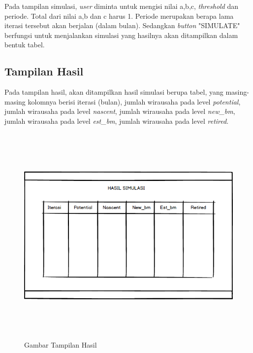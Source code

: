 Pada tampilan simulasi, \textit{user} diminta untuk mengisi nilai a,b,c, \textit{threshold} dan periode. Total dari nilai a,b dan c harus 1. Periode merupakan berapa lama iterasi tersebut akan berjalan (dalam bulan). Sedangkan \textit{button} "SIMULATE" berfungsi untuk menjalankan simulasi yang hasilnya akan ditampilkan dalam bentuk tabel.

\subsection{Tampilan Hasil}

Pada tampilan hasil, akan ditampilkan hasil simulasi berupa tabel, yang masing-masing kolomnya berisi iterasi (bulan), jumlah wirausaha pada level \textit{potential}, jumlah wirausaha pada level \textit{nascent}, jumlah wirausaha pada level \textit{new\_bm}, jumlah wirausaha pada level \textit{est\_bm}, jumlah wirausaha pada level \textit{retired}.
\begin{figure} [H]
	\centering  
	\includegraphics[width=13cm, height=11cm]{mockup6} 
	\caption[Gambar Tampilan Hasil]{Gambar Tampilan Hasil}
	\label{fig:tampilanHasil} 
\end{figure}

